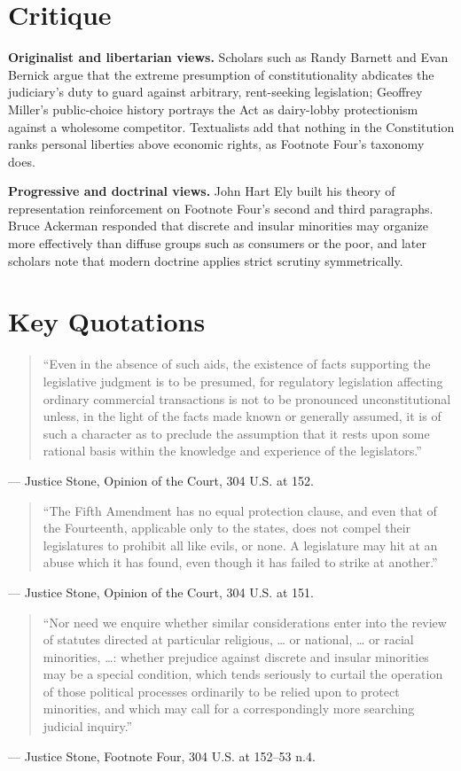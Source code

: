 \documentclass[12pt]{article}
\begin{document}
\section{Critique}

\textbf{Originalist and libertarian views.} Scholars such as Randy Barnett and Evan Bernick argue that the extreme presumption of constitutionality abdicates the judiciary's duty to guard against arbitrary, rent-seeking legislation; Geoffrey Miller's public-choice history portrays the Act as dairy-lobby protectionism against a wholesome competitor. Textualists add that nothing in the Constitution ranks personal liberties above economic rights, as Footnote Four's taxonomy does.

\textbf{Progressive and doctrinal views.} John Hart Ely built his theory of representation reinforcement on Footnote Four's second and third paragraphs. Bruce Ackerman responded that discrete and insular minorities may organize more effectively than diffuse groups such as consumers or the poor, and later scholars note that modern doctrine applies strict scrutiny symmetrically.

\section{Key Quotations}

\begin{quote}
``Even in the absence of such aids, the existence of facts supporting the legislative judgment is to be presumed, for regulatory legislation affecting ordinary commercial transactions is not to be pronounced unconstitutional unless, in the light of the facts made known or generally assumed, it is of such a character as to preclude the assumption that it rests upon some rational basis within the knowledge and experience of the legislators.''
\end{quote}
\noindent --- Justice Stone, Opinion of the Court, 304 U.S. at 152.

\begin{quote}
``The Fifth Amendment has no equal protection clause, and even that of the Fourteenth, applicable only to the states, does not compel their legislatures to prohibit all like evils, or none. A legislature may hit at an abuse which it has found, even though it has failed to strike at another.''
\end{quote}
\noindent --- Justice Stone, Opinion of the Court, 304 U.S. at 151.

\begin{quote}
``Nor need we enquire whether similar considerations enter into the review of statutes directed at particular religious, \dots{} or national, \dots{} or racial minorities, \dots{}: whether prejudice against discrete and insular minorities may be a special condition, which tends seriously to curtail the operation of those political processes ordinarily to be relied upon to protect minorities, and which may call for a correspondingly more searching judicial inquiry.''
\end{quote}
\noindent --- Justice Stone, Footnote Four, 304 U.S. at 152--53 n.4.
\end{document}
